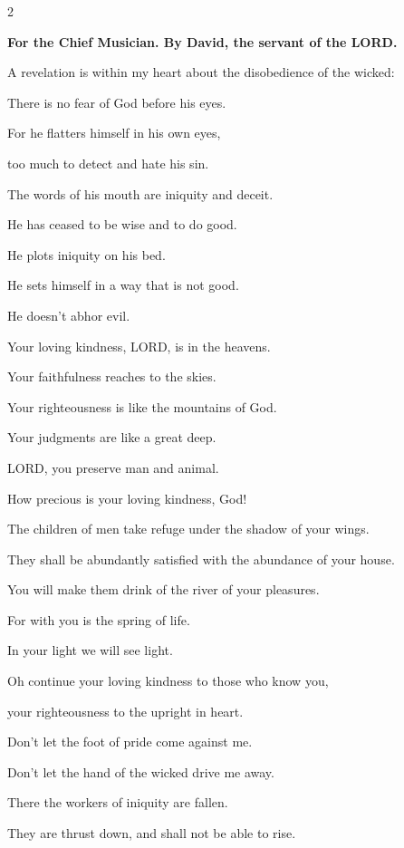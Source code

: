 \begin{multicols}{2}
	
	\mychapter{}\textbf{For the Chief Musician. By David, the servant of the LORD.}
	
	\myverse*{}A revelation is within my heart about the disobedience of the
	wicked:
	
	There is no fear of God before his eyes.
	
	
	\myverse{}For he flatters himself in his own eyes,
	
	too much to detect and hate his sin.
	
	
	\myverse{}The words of his mouth are iniquity and deceit.
	
	He has ceased to be wise and to do good.
	
	
	\myverse{}He plots iniquity on his bed.
	
	He sets himself in a way that is not good.
	
	He doesn’t abhor evil.
	
	\vspace{\baselineskip}
	
	\myverse{}Your loving kindness, LORD, is in the heavens.
	
	Your faithfulness reaches to the skies.
	
	
	\myverse{}Your righteousness is like the mountains of God.
	
	Your judgments are like a great deep.
	
	LORD, you preserve man and animal.
	
	
	\myverse{}How precious is your loving kindness, God!
	
	The children of men take refuge under the shadow of your wings.
	
	
	\myverse{}They shall be abundantly satisfied with the abundance of your
	house.
	
	You will make them drink of the river of your pleasures.
	
	
	\myverse{}For with you is the spring of life.
	
	In your light we will see light.
	
	
	\myverse{}Oh continue your loving kindness to those who know you,
	
	your righteousness to the upright in heart.
	
	
	\myverse{}Don’t let the foot of pride come against me.
	
	Don’t let the hand of the wicked drive me away.
	
	
	\myverse{}There the workers of iniquity are fallen.
	
	They are thrust down, and shall not be able to rise.
	

\end{multicols}
